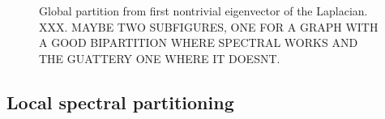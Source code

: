 \documentclass[12pt]{article}
\theoremstyle{plain}
\begin{document}
\begin{figure}
    \centering
    \caption{
             Global partition from first nontrivial eigenvector of the Laplacian.
XXX.  MAYBE TWO SUBFIGURES, ONE FOR A GRAPH WITH A GOOD BIPARTITION WHERE SPECTRAL WORKS AND THE GUATTERY ONE WHERE IT DOESNT.
}
\end{figure}


\subsection{Local spectral partitioning}
\end{document}
